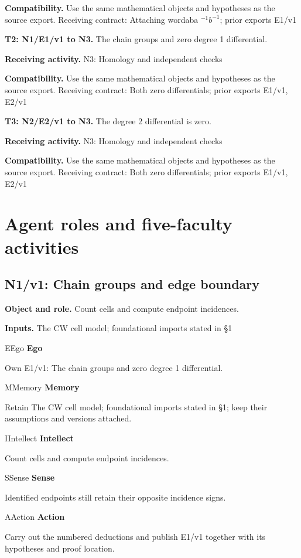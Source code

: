 \documentclass[preprint,12pt,aps,pra,showkeys,amsmath,amssymb,superscriptaddress,floatfix]{revtex4-2}
\theoremstyle{definition}
\theoremstyle{remark}
\newcommand{\mmfaculty}[3]{%
 \begin{mmfacultybox}{#1}{#2}
 {\sffamily\bfseries\color{MMBlue}#2}\par\smallskip #3
 \end{mmfacultybox}}
\newcommand{\field}[2]{\par\smallskip\noindent\textbf{#1.} #2\par}
\begin{document}
\field{Compatibility}{Use the same mathematical objects and hypotheses as the source export.
Receiving contract: Attaching wordaba \(^{-1}b^{-1}\); prior exports
E1/v1}

\field{T2: N1/E1/v1 to N3}{The chain groups and zero degree 1 differential.}

\field{Receiving activity}{N3: Homology and independent checks}

\field{Compatibility}{Use the same mathematical objects and hypotheses as the source export.
Receiving contract: Both zero differentials; prior exports E1/v1, E2/v1}

\field{T3: N2/E2/v1 to N3}{The degree 2 differential is zero.}

\field{Receiving activity}{N3: Homology and independent checks}

\field{Compatibility}{Use the same mathematical objects and hypotheses as the source export.
Receiving contract: Both zero differentials; prior exports E1/v1, E2/v1}

\endgroup

\clearpage\section{Agent roles and five-faculty activities}\begingroup\small\linespread{1.05}\selectfont{}

\subsection{N1/v1: Chain groups and edge boundary}

\field{Object and role}{Count cells and compute endpoint incidences.}

\field{Inputs}{The CW cell model; foundational imports stated in §1}

\mmfaculty{E}{Ego}{Own E1/v1: The chain groups and zero degree 1 differential.}

\mmfaculty{M}{Memory}{Retain The CW cell model; foundational imports stated in §1; keep their
assumptions and versions attached.}

\mmfaculty{I}{Intellect}{Count cells and compute endpoint incidences.}

\mmfaculty{S}{Sense}{Identified endpoints still retain their opposite incidence signs.}

\mmfaculty{A}{Action}{Carry out the numbered deductions and publish E1/v1 together with its
hypotheses and proof location.}
\end{document}
